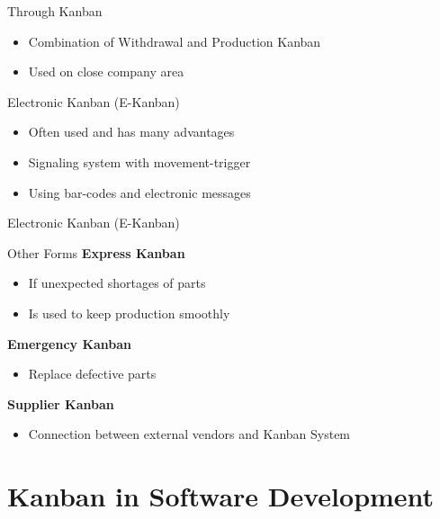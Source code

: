 \documentclass[12pt]{beamer}
\newcommand{\bi}{\begin{itemize}}
\newcommand{\ei}{\end{itemize}}
\begin{document}
		\begin{frame}{\secname}{Through Kanban}
			\bi
				\item Combination of Withdrawal and Production Kanban
				\item Used on close company area
			\ei
		\end{frame}
		
		\begin{frame}{\secname}{Electronic Kanban (E-Kanban)}
			\bi
				\item Often used and has many advantages
				\item Signaling system with movement-trigger
				\item Using bar-codes and electronic messages
			\ei
			
		\end{frame}
		
		\begin{frame}{\secname}{Electronic Kanban (E-Kanban)}
		\end{frame}
		
		\begin{frame}{\secname}{Other Forms}
			\textbf{Express Kanban}
			\bi
				\item If unexpected shortages of parts
				\item Is used to keep production smoothly
			\ei
			
			\vspace{0.5cm}
			\pause
			
			\textbf{Emergency Kanban}
			\bi
				\item Replace defective parts
			\ei
			
			\vspace{0.5cm}
			\pause
			
			\textbf{Supplier Kanban}
			\bi
				\item Connection between external vendors and Kanban System
			\ei				
		\end{frame}
				
		
	\section{Kanban in Software Development}
	
\end{document}
